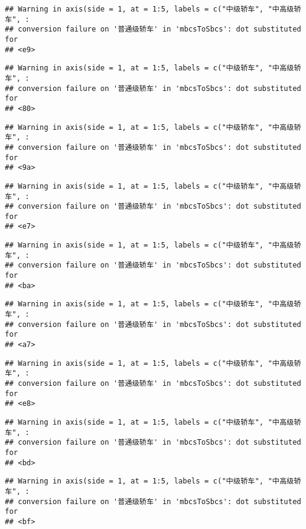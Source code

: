 \documentclass[]{article}
\begin{document}
\begin{verbatim}
## Warning in axis(side = 1, at = 1:5, labels = c("中级轿车", "中高级轿车", :
## conversion failure on '普通级轿车' in 'mbcsToSbcs': dot substituted for
## <e9>
\end{verbatim}

\begin{verbatim}
## Warning in axis(side = 1, at = 1:5, labels = c("中级轿车", "中高级轿车", :
## conversion failure on '普通级轿车' in 'mbcsToSbcs': dot substituted for
## <80>
\end{verbatim}

\begin{verbatim}
## Warning in axis(side = 1, at = 1:5, labels = c("中级轿车", "中高级轿车", :
## conversion failure on '普通级轿车' in 'mbcsToSbcs': dot substituted for
## <9a>
\end{verbatim}

\begin{verbatim}
## Warning in axis(side = 1, at = 1:5, labels = c("中级轿车", "中高级轿车", :
## conversion failure on '普通级轿车' in 'mbcsToSbcs': dot substituted for
## <e7>
\end{verbatim}

\begin{verbatim}
## Warning in axis(side = 1, at = 1:5, labels = c("中级轿车", "中高级轿车", :
## conversion failure on '普通级轿车' in 'mbcsToSbcs': dot substituted for
## <ba>
\end{verbatim}

\begin{verbatim}
## Warning in axis(side = 1, at = 1:5, labels = c("中级轿车", "中高级轿车", :
## conversion failure on '普通级轿车' in 'mbcsToSbcs': dot substituted for
## <a7>
\end{verbatim}

\begin{verbatim}
## Warning in axis(side = 1, at = 1:5, labels = c("中级轿车", "中高级轿车", :
## conversion failure on '普通级轿车' in 'mbcsToSbcs': dot substituted for
## <e8>
\end{verbatim}

\begin{verbatim}
## Warning in axis(side = 1, at = 1:5, labels = c("中级轿车", "中高级轿车", :
## conversion failure on '普通级轿车' in 'mbcsToSbcs': dot substituted for
## <bd>
\end{verbatim}

\begin{verbatim}
## Warning in axis(side = 1, at = 1:5, labels = c("中级轿车", "中高级轿车", :
## conversion failure on '普通级轿车' in 'mbcsToSbcs': dot substituted for
## <bf>
\end{verbatim}
\end{document}
